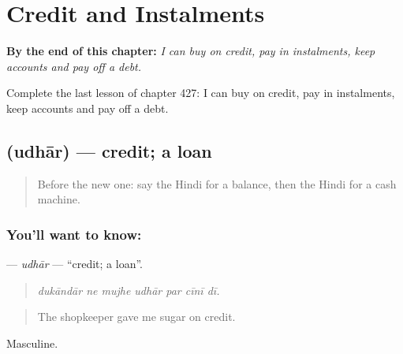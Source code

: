
\chapter{Credit and Instalments}
\label{ch:hi-credit-and-instalments}

\begin{chapteropening}
\textbf{By the end of this chapter:} \emph{I can buy on credit, pay in instalments, keep accounts and pay off a debt.}

Complete the last lesson of chapter 427: I can buy on credit, pay in instalments, keep accounts and pay off a debt.
\end{chapteropening}

\section[\texorpdfstring{\hi{उधार} (udhār)}{उधार (udhār)}]{ (udhār) — credit; a loan}

\label{lesson:HI-C427-udhar}



\begin{quote}
Before the new one: say the Hindi for a balance, then the Hindi for a cash machine.
\end{quote}

\subsection*{You'll want to know: }
\textbf{} — \emph{udhār} — \textquotedblleft{}credit; a loan\textquotedblright{}.

\begin{quote}
      
\end{quote}

\begin{quote}
\emph{dukāndār ne mujhe udhār par cīnī dī.}
\end{quote}

\begin{quote}
The shopkeeper gave me sugar on credit.
\end{quote}

Masculine.

